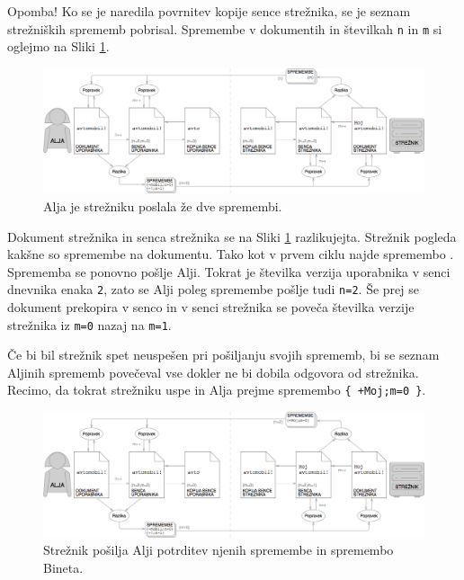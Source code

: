 \documentclass[a4paper, 12pt, twoside]{book}
\begin{document}
Opomba! Ko se je naredila povrnitev kopije sence strežnika, se je seznam strežniških sprememb pobrisal. Spremembe v dokumentih in številkah {\tt n} in {\tt m} si oglejmo na Sliki \ref{ds8}.

\begin{figure}[placement h]
\begin{center}
\includegraphics[width=16cm]{ds8.png}
\end{center}
\caption{Alja je strežniku poslala že dve spremembi.}
\label{ds8}
\end{figure}

Dokument strežnika in senca strežnika se na Sliki \ref{ds8} razlikujejta. Strežnik pogleda kakšne so spremembe na dokumentu. Tako kot v prvem ciklu najde spremembo . Sprememba se ponovno pošlje Alji. Tokrat je številka verzija uporabnika v senci dnevnika enaka {\tt 2}, zato se Alji poleg spremembe pošlje tudi {\tt n=2}. Še prej se dokument prekopira v senco in v senci strežnika se poveča številka verzije strežnika iz {\tt m=0} nazaj na {\tt m=1}.

Če bi bil strežnik spet neuspešen pri pošiljanju svojih sprememb, bi se seznam Aljinih sprememb povečeval vse dokler ne bi dobila odgovora od strežnika. Recimo, da tokrat strežniku uspe in Alja prejme spremembo {\tt \{ +Moj;m=0 \}}.

\begin{figure}[placement h]
\begin{center}
\includegraphics[width=16cm]{ds9.png}
\end{center}
\caption{Strežnik pošilja Alji potrditev njenih spremembe in spremembo Bineta.}
\label{ds9}
\end{figure}
\end{document}
